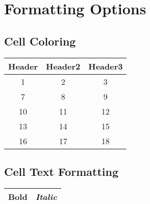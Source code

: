 \documentclass{article}
\begin{document}
\section{Formatting Options}

\subsection{Cell Coloring}

\begin{tabular}{|c|c|c|}
\hline
\rowcolor{purple}
Header & Header2 & Header3 \\
\hline
1 & 2 & 3 \\
7 & 8 & 9 \\
10 & 11 & 12 \\
13 & 14 & 15 \\
16 & 17 & 18 \\
\hline
\end{tabular}

\subsection{Cell Text Formatting}

\begin{tabular}{|c|c|}
\hline
\textbf{Bold} & \textit{Italic} \\
\hline
\end{tabular}

\end{document}
